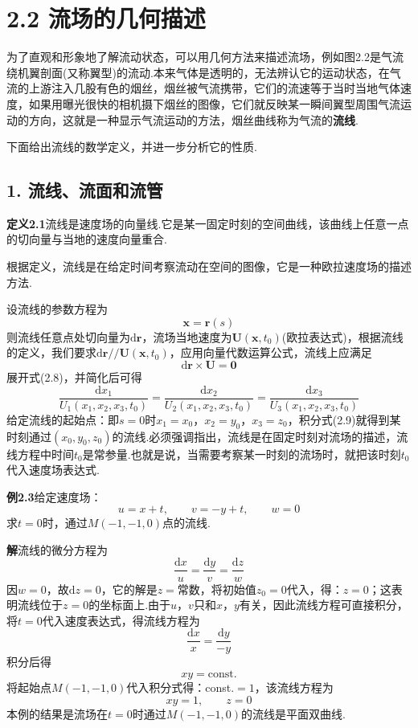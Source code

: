 \section*{2.2  流场的几何描述}

为了直观和形象地了解流动状态，可以用几何方法来描述流场，例如图2.2是气流绕机翼剖面(又称翼型)的流动.本来气体是透明的，无法辨认它的运动状态，在气流的上游注入几股有色的烟丝，烟丝被气流携带，它们的流速等于当时当地气体速度，如果用曝光很快的相机摄下烟丝的图像，它们就反映某一瞬间翼型周围气流运动的方向，这就是一种显示气流运动的方法，烟丝曲线称为气流的\textbf{流线}.

下面给出流线的数学定义，并进一步分析它的性质.

\subsection*{1. 流线、流面和流管}

\noindent\textbf{定义2.1}\quad 流线是速度场的向量线.它是某一固定时刻的空间曲线，该曲线上任意一点的切向量与当地的速度向量重合.

根据定义，流线是在给定时间考察流动在空间的图像，它是一种欧拉速度场的描述方法.

设流线的参数方程为
\[
\boldsymbol{x}=\boldsymbol{r}(s)
\]
则流线任意点处切向量为$\mathrm{d}\boldsymbol{r}$，流场当地速度为$\boldsymbol{U}(\boldsymbol{x},t_0)$(欧拉表达式)，根据流线的定义，我们要求$\mathrm{d}\boldsymbol{r}/\!/\boldsymbol{U}(\boldsymbol{x},t_0)$，应用向量代数运算公式，流线上应满足
\begin{equation*}
\mathrm{d}\boldsymbol{r}\times\boldsymbol{U}=\boldsymbol{0}
\tag{2.8}
\end{equation*}
展开式(2.8)，并简化后可得
\begin{equation*}
\frac{\mathrm{d}x_1}{U_1(x_1,x_2,x_3,t_0)}=\frac{\mathrm{d}x_2}{U_2(x_1,x_2,x_3,t_0)}=\frac{\mathrm{d}x_3}{U_3(x_1,x_2,x_3,t_0)}
\tag{2.9}
\end{equation*}
给定流线的起始点：即$s=0$时$x_1=x_0$，$x_2=y_0$，$x_3=z_0$，积分式(2.9)就得到某时刻通过$(x_0,y_0,z_0)$的流线.必须强调指出，流线是在固定时刻对流场的描述，流线方程中时间$t_0$是常参量.也就是说，当需要考察某一时刻的流场时，就把该时刻$t_0$代入速度场表达式.

\noindent\textbf{例2.3}\quad 给定速度场：
\[
u=x+t,\qquad v=-y+t,\qquad w=0
\]
求$t=0$时，通过$M(-1,-1,0)$点的流线.

\noindent\textbf{解}\quad 流线的微分方程为
\[
\frac{\mathrm{d}x}{u}=\frac{\mathrm{d}y}{v}=\frac{\mathrm{d}z}{w}
\]
因$w=0$，故$\mathrm{d}z=0$，它的解是$z=$常数，将初始值$z_0=0$代入，得：$z=0$；这表明流线位于$z=0$的坐标面上.由于$u$，$v$只和$x$，$y$有关，因此流线方程可直接积分，将$t=0$代入速度表达式，得流线方程为
\[
\frac{\mathrm{d}x}{x}=\frac{\mathrm{d}y}{-y}
\]
积分后得
\[
xy=\mathrm{const.}
\]
将起始点$M(-1,-1,0)$代入积分式得：const.$=1$，该流线方程为
\[
xy=1,\qquad z=0
\]
本例的结果是流场在$t=0$时通过$M(-1,-1,0)$的流线是平面双曲线.

